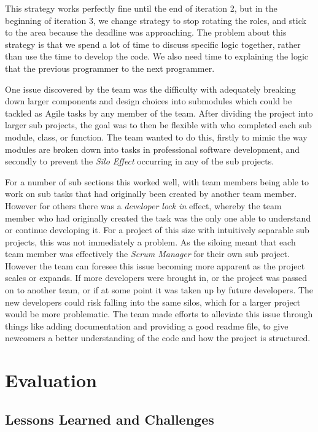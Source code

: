 \documentclass[11pt]{article}
\begin{document}
This strategy works perfectly fine until the end of iteration 2, but in the beginning of iteration 3, we change strategy to stop rotating the roles, and stick to the area because the deadline was approaching. The problem about this strategy is that we spend a lot of time to discuss specific logic together, rather than use the time to develop the code. We also need time to explaining the logic that the previous programmer to the next programmer. 

One issue discovered by the team was the difficulty with adequately breaking down larger components and design choices into submodules which could be tackled as Agile tasks by any member of the team. After dividing the project into larger sub projects, the goal was to then be flexible with who completed each sub module, class, or function. The team wanted to do this, firstly to mimic the way modules are broken down into tasks in professional software development, and secondly to prevent the \textit{Silo Effect} occurring in any of the sub projects. 
	
For a number of sub sections this worked well, with team members being able to work on sub tasks that had originally been created by another team member. However for others there was a \textit{developer lock in} effect, whereby the team member who had originally created the task was the only one able to understand or continue developing it. For a project of this size with intuitively separable sub projects, this was not immediately a problem. As the siloing meant that each team member was effectively the \textit{Scrum Manager} for their own sub project. However the team can foresee this issue becoming more apparent as the project scales or expands. If more developers were brought in, or the project was passed on to another team, or if at some point it was taken up by future developers. The new developers could risk falling into the same silos, which for a larger project would be more problematic. The team made efforts to alleviate this issue through things like adding documentation and providing a good readme file, to give newcomers a better understanding of the code and how the project is structured.

\pagebreak
\section{Evaluation} 
\subsection{Lessons Learned and Challenges}
\end{document}
